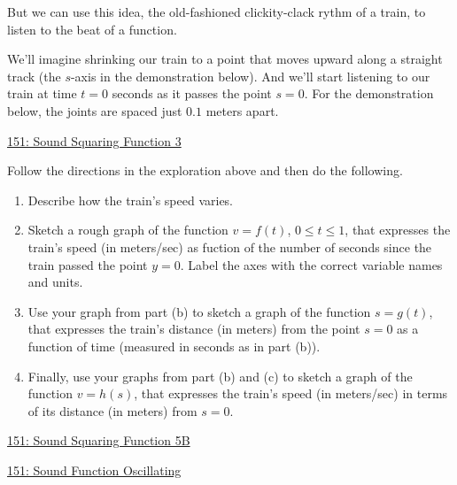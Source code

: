 \documentclass{ximera}
\begin{document}
\begin{exploration}  \label{EP9ppdfgdggt}

But we can use this idea, the old-fashioned clickity-clack rythm of a train, to listen to the beat of a function.

We'll imagine shrinking our train to a point that moves upward along a straight track (the $s$-axis in the demonstration below). And we'll start listening to our train at time $t=0$ seconds as it passes the point $s=0$. For the demonstration below, the joints are spaced just $0.1$ meters apart.

\begin{onlineOnly}
    \begin{center}
\end{center}
\end{onlineOnly}

\href{https://www.desmos.com/calculator/qjsfuvhsv9}{151: Sound Squaring Function 3}

Follow the directions in the exploration above and then do the following.

\begin{enumerate}
\item Describe how the train's speed varies.

\item Sketch a rough graph of the function $v=f(t)$, $0\leq t \leq 1$, that expresses the train's speed (in meters/sec) as fuction of the number of seconds since the train passed the point $y=0$. Label the axes with the correct variable names and units.

\item Use your graph from part (b) to sketch a graph of the function $s=g(t)$, that expresses the train's distance (in meters) from the point $s=0$ as a function of time (measured in seconds as in part (b)).

\item Finally, use your graphs from part (b) and (c) to sketch a graph of the function $v=h(s)$, that expresses the train's speed (in meters/sec) in terms of its distance (in meters) from $s=0$.  
\end{enumerate}

\begin{onlineOnly}
    \begin{center}
\end{center}
\end{onlineOnly}

\href{https://www.desmos.com/calculator/xaajoakuug}{151: Sound Squaring Function 5B}


\end{exploration}


\begin{exploration}  \label{Ex098idiggdgg}

\begin{onlineOnly}
    \begin{center}
\end{center}
\end{onlineOnly}

\href{https://www.desmos.com/calculator/jczadsrruz}{151: Sound Function Oscillating}

\end{exploration}
\end{document}
